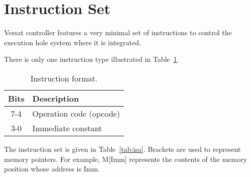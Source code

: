 \section{Instruction Set}
\label{sec:isa}

Versat controller features a very minimal set of instructions to
control the execution hole system where it is integrated. 

There is only one instruction type illustrated in Table~\ref{tab:if}.
\begin{table}[!htbp]
  \centering
    \begin{tabular}{|c|p{7cm}|}
    \hline 
    {\bf Bits} & {\bf Description} \\
    \hline \hline 
     7-4 & Operation code (opcode)\\
    \hline
     3-0 & Immediate constant \\
    \hline

    \end{tabular}
  \caption{Instruction format.}
  \label{tab:if}
\end{table}


The instruction set is given in Table~\ref{tab:isa}. Brackets are used
to represent memory pointers. For example, M[Imm] represents the
contents of the memory position whose address is Imm.


